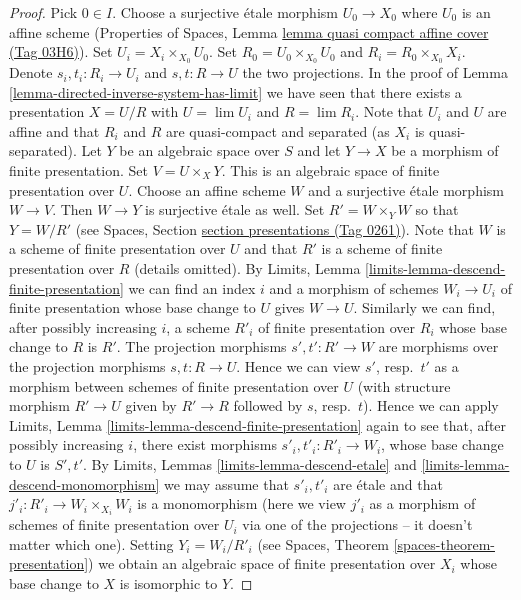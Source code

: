 \documentclass{amsart}
\theoremstyle{plain}
\theoremstyle{definition}
\theoremstyle{remark}
\numberwithin{equation}{subsection}
\def\lim{\mathop{\mathrm{lim}}\nolimits}
\begin{document}
\begin{proof}
Pick $0 \in I$. Choose a surjective \'etale morphism $U_0 \to X_0$ where
$U_0$ is an affine scheme (Properties of Spaces, Lemma
\href{https://stacks.math.columbia.edu/tag/03H6}{lemma quasi compact affine cover (Tag 03H6)}).
Set $U_i = X_i \times_{X_0} U_0$. Set $R_0 = U_0 \times_{X_0} U_0$ and
$R_i = R_0 \times_{X_0} X_i$. Denote $s_i, t_i : R_i \to U_i$ and
$s, t : R \to U$ the two projections. In the proof of
Lemma \ref{lemma-directed-inverse-system-has-limit} we have
seen that there exists a presentation $X = U/R$ with
$U = \lim U_i$ and $R = \lim R_i$. Note that $U_i$ and $U$ are affine and
that $R_i$ and $R$ are quasi-compact and separated (as $X_i$ is
quasi-separated). Let $Y$ be an algebraic space over $S$ and let
$Y \to X$ be a morphism of finite presentation. Set $V = U \times_X Y$.
This is an algebraic space of finite presentation over $U$.
Choose an affine scheme $W$ and a surjective \'etale morphism $W \to V$.
Then $W \to Y$ is surjective \'etale as well. Set $R' = W \times_Y W$
so that $Y = W/R'$ (see Spaces, Section \href{https://stacks.math.columbia.edu/tag/0261}{section presentations (Tag 0261)}).
Note that $W$ is a scheme of finite presentation over $U$ and that $R'$
is a scheme of finite presentation over $R$ (details omitted).
By Limits, Lemma \ref{limits-lemma-descend-finite-presentation}
we can find an index $i$ and a morphism of schemes $W_i \to U_i$ of
finite presentation whose base change to $U$ gives $W \to U$. Similarly
we can find, after possibly increasing $i$, a scheme $R'_i$ of finite
presentation over $R_i$ whose base change to $R$ is $R'$.
The projection morphisms $s', t' : R' \to W$ are morphisms over
the projection morphisms $s, t : R \to U$. Hence we can view $s'$,
resp.\ $t'$ as a morphism between schemes of finite presentation over
$U$ (with structure morphism $R' \to U$ given by $R' \to R$ followed
by $s$, resp.\ $t$). Hence we can apply
Limits, Lemma \ref{limits-lemma-descend-finite-presentation}
again to see that, after possibly increasing $i$, there exist
morphisms $s'_i, t'_i : R'_i \to W_i$, whose base change to $U$
is $S', t'$. By Limits, Lemmas \ref{limits-lemma-descend-etale} and
\ref{limits-lemma-descend-monomorphism}
we may assume that $s'_i, t'_i$ are \'etale and that
$j'_i : R'_i \to W_i \times_{X_i} W_i$ is a monomorphism (here we
view $j'_i$ as a morphism of schemes of finite presentation over $U_i$ via
one of the projections -- it doesn't matter which one). Setting
$Y_i = W_i/R'_i$ (see Spaces, Theorem \ref{spaces-theorem-presentation})
we obtain an algebraic space of finite presentation
over $X_i$ whose base change to $X$ is isomorphic to $Y$.


\end{proof}
\end{document}
